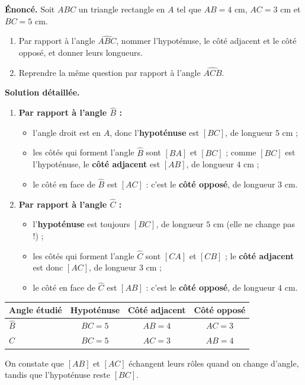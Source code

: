\documentclass[11pt]{article}
\begin{document}
\begin{exoresolu}
\textbf{Énoncé.} Soit $ABC$ un triangle rectangle en $A$ tel que $AB = 4$ cm, $AC = 3$ cm et $BC = 5$ cm.
\begin{enumerate}
\item Par rapport à l'angle $\widehat{ABC}$, nommer l'hypoténuse, le côté adjacent et le côté opposé, et donner leurs longueurs.
\item Reprendre la même question par rapport à l'angle $\widehat{ACB}$.
\end{enumerate}
\tcblower
\textbf{Solution détaillée.}
\begin{enumerate}
\item \textbf{Par rapport à l'angle $\widehat{B}$ :}
\begin{itemize}
\item l'angle droit est en $A$, donc l'\textbf{hypoténuse} est $[BC]$, de longueur $5$ cm ;
\item les côtés qui forment l'angle $\widehat{B}$ sont $[BA]$ et $[BC]$ ; comme $[BC]$ est l'hypoténuse, le \textbf{côté adjacent} est $[AB]$, de longueur $4$ cm ;
\item le côté en face de $\widehat{B}$ est $[AC]$ : c'est le \textbf{côté opposé}, de longueur $3$ cm.
\end{itemize}
\item \textbf{Par rapport à l'angle $\widehat{C}$ :}
\begin{itemize}
\item l'\textbf{hypoténuse} est toujours $[BC]$, de longueur $5$ cm (elle ne change pas !) ;
\item les côtés qui forment l'angle $\widehat{C}$ sont $[CA]$ et $[CB]$ ; le \textbf{côté adjacent} est donc $[AC]$, de longueur $3$ cm ;
\item le côté en face de $\widehat{C}$ est $[AB]$ : c'est le \textbf{côté opposé}, de longueur $4$ cm.
\end{itemize}
\end{enumerate}
\begin{center}
\begin{tabular}{|l|c|c|c|}
\hline
\rowcolor{popblueL} Angle étudié & Hypoténuse & Côté adjacent & Côté opposé \\
\hline
$\widehat{B}$ & $BC = 5$ & $AB = 4$ & $AC = 3$ \\
\hline
$\widehat{C}$ & $BC = 5$ & $AC = 3$ & $AB = 4$ \\
\hline
\end{tabular}
\end{center}
On constate que $[AB]$ et $[AC]$ échangent leurs rôles quand on change d'angle, tandis que l'hypoténuse reste $[BC]$.
\end{exoresolu}
\end{document}
